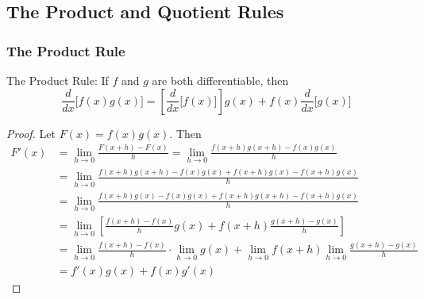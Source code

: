 \subsection{The Product and Quotient Rules}

\subsubsection*{The Product Rule}
The Product Rule: If \(f\) and \(g\) are both differentiable, then
\[\frac{d}{dx}\bigl[f(x)g(x)\bigr]
=\left[\frac{d}{dx}\big[f(x)\big]\right]g(x)+f(x)\frac{d}{dx}\big[g(x)\big]\]
\begin{proof}
    Let \(F(x)=f(x)g(x)\).
    Then
    \begin{align*}
        F'(x) 
        &= \lim_{h\to 0}\frac{F(x+h)-F(x)}{h}
        =\lim_{h\to 0}\frac{f(x+h)g(x+h)-f(x)g(x)}{h} \\
        &= \lim_{h\to 0}\frac{f(x+h)g(x+h)-f(x)g(x)+f(x+h)g(x)-f(x+h)g(x)}{h} \\
        &= \lim_{h\to 0}\frac{f(x+h)g(x)-f(x)g(x)+f(x+h)g(x+h)-f(x+h)g(x)}{h} \\
        &= \lim_{h\to 0}
        \left[\frac{f(x+h)-f(x)}{h}g(x)+f(x+h)\frac{g(x+h)-g(x)}{h}\right] \\
        &= \lim_{h\to 0}\frac{f(x+h)-f(x)}{h}\cdot\lim_{h\to 0}g(x)
        +\lim_{h\to 0}f(x+h)\lim_{h\to 0}\frac{g(x+h)-g(x)}{h} \\
        &= f'(x)g(x)+f(x)g'(x)
    \end{align*}
\end{proof}

